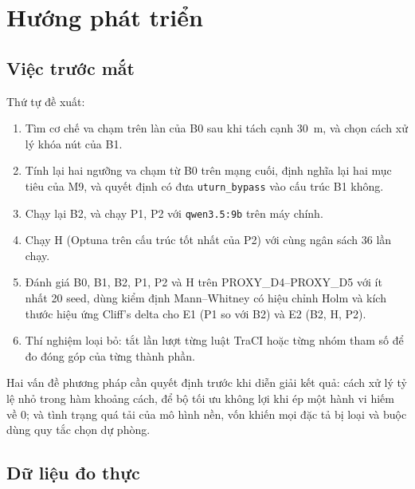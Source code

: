 \documentclass[../DoAn.tex]{subfiles}
\begin{document}
\section{Hướng phát triển}

\subsection{Việc trước mắt}

Thứ tự đề xuất:
\begin{enumerate}[label=(\arabic*)]
    \item Tìm cơ chế va chạm trên làn của B0 sau khi tách cạnh 30~m, và chọn cách xử lý khóa nút của B1.
    \item Tính lại hai ngưỡng va chạm từ B0 trên mạng cuối, định nghĩa lại hai mục tiêu của M9, và quyết định có đưa \texttt{uturn\_bypass} vào cấu trúc B1 không.
    \item Chạy lại B2, và chạy P1, P2 với \texttt{qwen3.5:9b} trên máy chính.
    \item Chạy H (Optuna trên cấu trúc tốt nhất của P2) với cùng ngân sách 36 lần chạy.
    \item Đánh giá B0, B1, B2, P1, P2 và H trên PROXY\_D4--PROXY\_D5 với ít nhất 20 seed, dùng kiểm định Mann--Whitney có hiệu chỉnh Holm và kích thước hiệu ứng Cliff's delta cho E1 (P1 so với B2) và E2 (B2, H, P2).
    \item Thí nghiệm loại bỏ: tắt lần lượt từng luật TraCI hoặc từng nhóm tham số để đo đóng góp của từng thành phần.
\end{enumerate}
Hai vấn đề phương pháp cần quyết định trước khi diễn giải kết quả: cách xử lý tỷ lệ nhỏ trong hàm khoảng cách, để bộ tối ưu không lợi khi ép một hành vi hiếm về 0; và tình trạng quá tải của mô hình nền, vốn khiến mọi đặc tả bị loại và buộc dùng quy tắc chọn dự phòng.

\subsection{Dữ liệu đo thực}
\end{document}
